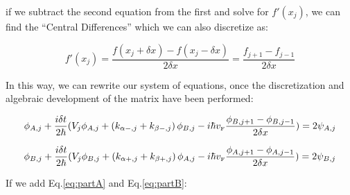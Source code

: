 \noindent if we subtract the second equation from the first and solve for $f'(x_j)$, we can find the ``Central Differences'' which we can also discretize as:

\begin{equation}
    \label{eq:diferenciasCentradas}
    f'(x_j)=\frac{f(x_j+\delta x)-f(x_j-\delta x)}{2\delta x} = \frac{f_{j+1}-f_{j-1}}{2\delta x}
\end{equation}

In this way, we can rewrite our system of equations, once the discretization and algebraic development of the matrix have been performed:

\begin{equation}
        \label{eq:partA}
    \phi_{A, j} + \frac{i\delta t}{2\hbar}(V_j\phi_{A,j} + \left(k_{\alpha-,j}+k_{\beta-,j}\right)\phi_{B,j}-
    i\hbar v_{\mbox{\tiny F}}\frac{\phi_{B, j+1}-\phi_{B, j-1}}{2\delta x}) = 2\psi_{A,j}
\end{equation}

\begin{equation}
    \label{eq:partB}
    \phi_{B, j} + \frac{i\delta t}{2\hbar}(V_j\phi_{B,j} + \left(k_{\alpha+,j}+k_{\beta+,j}\right)\phi_{A,j}-
    i\hbar v_{\mbox{\tiny F}}\frac{\phi_{A, j+1}-\phi_{A, j-1}}{2\delta x}) = 2\psi_{B,j}
\end{equation}

If we add Eq.\eqref{eq:partA} and Eq.\eqref{eq:partB}:


